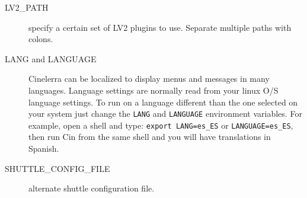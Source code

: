 \begin{description}
    \item[{\small LV2\_PATH}] specify a certain set of LV2 plugins to use.  Separate multiple paths with colons.
    \item[{\small LANG and LANGUAGE}] Cinelerra can be localized to display menus and messages in many languages. Language settings are normally read from your linux O/S language settings. To run on a language different than the one selected on your system just change the \texttt{LANG} and \texttt{LANGUAGE} environment variables.  For example, open a shell and type: \texttt{export LANG=es\_ES} or
    \texttt{LANGUAGE=es\_ES}, then run Cin from the same shell and you will have translations in Spanish.
    \item[{\small SHUTTLE\_CONFIG\_FILE}] alternate shuttle configuration file.
\end{description}

